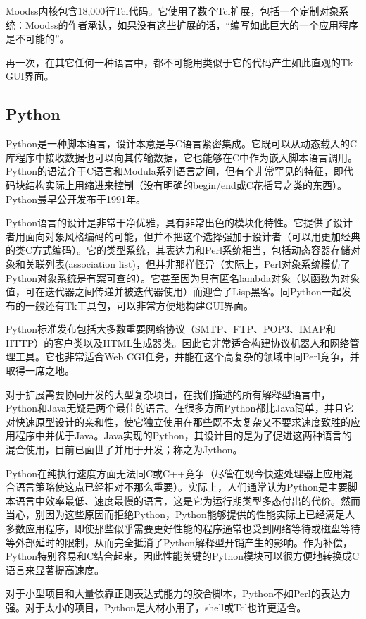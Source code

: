 \documentclass[12pt,oneside]{book}
\begin{document}
Moodss内核包含18,000行Tcl代码。它使用了数个Tcl扩展，包括一个定制对象系统：Moodss的作者承认，如果没有这些扩展的话，“编写如此巨大的一个应用程序是不可能的”。

再一次，在其它任何一种语言中，都不可能用类似于它的代码产生如此直观的Tk GUI界面。

\subsection{Python}
Python是一种脚本语言，设计本意是与C语言紧密集成。它既可以从动态载入的C库程序中接收数据也可以向其传输数据，它也能够在C中作为嵌入脚本语言调用。Python的语法介于C语言和Modula系列语言之间，但有个非常罕见的特征，即代码块结构实际上用缩进来控制（没有明确的begin/end或C花括号之类的东西）。Python最早公开发布于1991年。

Python语言的设计是非常干净优雅，具有非常出色的模块化特性。它提供了设计者用面向对象风格编码的可能，但并不把这个选择强加于设计者（可以用更加经典的类C方式编码）。它的类型系统，其表达力和Perl系统相当，包括动态容器存储对象和关联列表(association list)，但并非那样怪异（实际上，Perl对象系统模仿了Python对象系统是有案可查的）。它甚至因为具有匿名lambda对象（以函数为对象值，可在迭代器之间传递并被迭代器使用）而迎合了Lisp黑客。同Python一起发布的一般还有Tk工具包，可以非常方便地构建GUI界面。

Python标准发布包括大多数重要网络协议（SMTP、FTP、POP3、IMAP和HTTP）的客户类以及HTML生成器类。因此它非常适合构建协议机器人和网络管理工具。它也非常适合Web CGI任务，并能在这个高复杂的领域中同Perl竞争，并取得一席之地。

对于扩展需要协同开发的大型复杂项目，在我们描述的所有解释型语言中，Python和Java无疑是两个最佳的语言。在很多方面Python都比Java简单，并且它对快速原型设计的亲和性，使它独立使用在那些既不太复杂又不要求速度致胜的应用程序中并优于Java。Java实现的Python，其设计目的是为了促进这两种语言的混合使用，目前已面世了并用于开发；称之为Jython。

Python在纯执行速度方面无法同C或C++竞争（尽管在现今快速处理器上应用混合语言策略使这点已经相对不那么重要）。实际上，人们通常认为Python是主要脚本语言中效率最低、速度最慢的语言，这是它为运行期类型多态付出的代价。然而当心，别因为这些原因而拒绝Python，Python能够提供的性能实际上已经满足人多数应用程序，即使那些似乎需要更好性能的程序通常也受到网络等待或磁盘等待等外部延时的限制，从而完全抵消了Python解释型开销产生的影响。作为补偿，Python特别容易和C结合起来，因此性能关键的Python模块可以很方便地转换成C语言来显著提高速度。

对于小型项目和大量依靠正则表达式能力的胶合脚本，Python不如Perl的表达力强。对于太小的项目，Python是大材小用了，shell或Tcl也许更适合。
\end{document}
